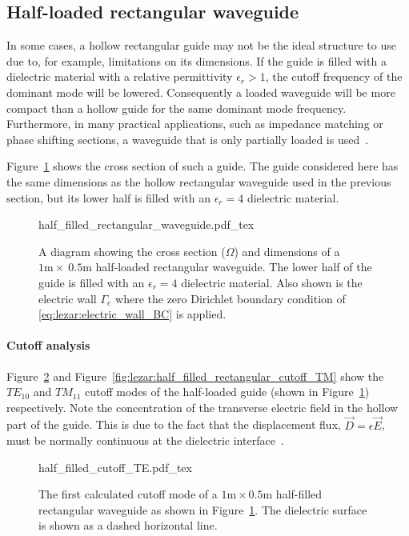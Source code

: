 \subsection{Half-loaded rectangular waveguide}
In some cases, a hollow rectangular guide may not be the ideal structure to use due to, for example, limitations on its dimensions. If the guide is filled with a dielectric material with a relative permittivity $\epsilon_r > 1$, the cutoff frequency of the dominant mode will be lowered. Consequently a loaded waveguide will be more compact than a hollow guide for the same dominant mode frequency. Furthermore, in many practical applications, such as impedance matching or phase shifting sections, a waveguide that is only partially loaded is used~\citep{Pozar2005}.

Figure~\ref{fig:lezar:half_filled_rectangular_guide} shows the cross section of such a guide. The guide considered here has the same dimensions as the hollow rectangular waveguide used in the previous section, but its lower half is filled with an $\epsilon_r = 4$ dielectric material.
\begin{figure}
    \centering
    \def\svgwidth{\smallfig}
    {half_filled_rectangular_waveguide.pdf_tex}
    \caption{A diagram showing the cross section ($\Omega$) and dimensions of a $1\text{m}\times~0.5\text{m}$ half-loaded rectangular waveguide. The lower half of the guide is filled with an $\epsilon_r = 4$ dielectric material. Also shown is the electric wall $\Gamma_e$ where the zero Dirichlet boundary condition of \eqref{eq:lezar:electric_wall_BC} is applied.}
    \label{fig:lezar:half_filled_rectangular_guide}
\end{figure}

\paragraph{Cutoff analysis}

Figure~\ref{fig:lezar:half_filled_rectangular_cutoff_TE} and Figure~\ref{fig:lezar:half_filled_rectangular_cutoff_TM} show the $TE_{10}$ and $TM_{11}$ cutoff modes of the half-loaded guide (shown in Figure~\ref{fig:lezar:half_filled_rectangular_guide}) respectively. Note the concentration of the transverse electric field in the hollow part of the guide. This is due to the fact that the displacement flux, $\vec{D} = \epsilon\vec{E}$, must be normally continuous at the dielectric interface~\citep{Pozar2005, Smith1997}.
\begin{figure}[h]
\centering
  \def\svgwidth{\smallfig}
    {half_filled_cutoff_TE.pdf_tex}
\caption{The first calculated cutoff mode of a $1\text{m}\times0.5\text{m}$ half-filled rectangular waveguide as shown in Figure~\ref{fig:lezar:half_filled_rectangular_guide}. The dielectric surface is shown as a dashed horizontal line.}
\label{fig:lezar:half_filled_rectangular_cutoff_TE}
\end{figure}

